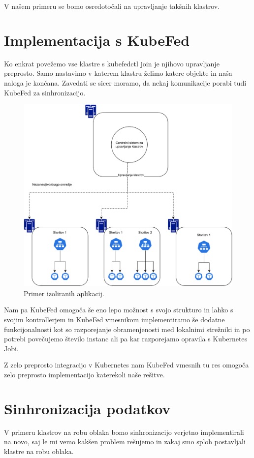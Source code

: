 \documentclass[a4paper, 12pt]{book}
\begin{document}
V našem primeru se bomo osredotočali na upravljanje takšnih klastrov.
\section{Implementacija s KubeFed}
Ko enkrat povežemo vse klastre s kubefedctl join je njihovo upravljanje preprosto.
Samo nastavimo v katerem klastru želimo katere objekte in naša naloga je končana.
Zavedati se sicer moramo, da nekaj komunikacije porabi tudi KubeFed za sinhronizacijo.
\begin{figure}[h]
\begin{center}
\includegraphics[width=1.0\textwidth]{images/upravljanje-robnih-klastrov.pdf}
\end{center}
\caption{Primer izoliranih aplikacij.}
\label{problem-prevelike-latence}
\end{figure}

Nam pa KubeFed omogoča še eno lepo možnost s svojo strukturo in lahko s svojim kontrollerjem in KubeFed vmesnikom implementiramo še dodatne funkcijonalnosti kot so razporejanje obramenjenosti med lokalnimi strežniki in po potrebi povečujemo število instanc ali pa kar razporejamo opravila s Kubernetes Jobi.

Z zelo preprosto integracijo v Kubernetes nam KubeFed vmesnih tu res omogoča zelo preprosto implementacijo katerekoli naše rešitve.
\section{Sinhronizacija podatkov}
V primeru klastrov na robu oblaka bomo sinhronizacijo verjetno implementirali na novo, saj le mi vemo kakšen problem rešujemo in zakaj smo sploh postavljali klastre na robu oblaka.
\end{document}
